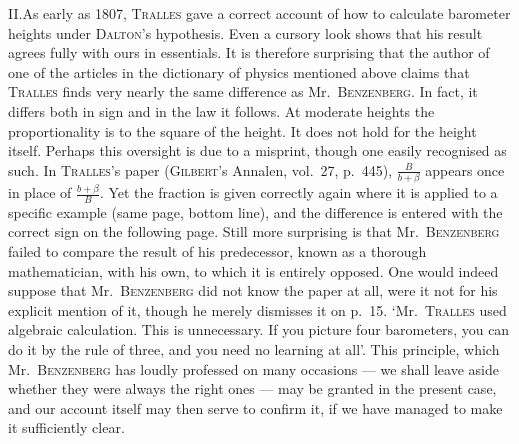 II.\quad As early as 1807, \textsc{Tralles} gave a correct account of how to calculate barometer heights under \textsc{Dalton}’s hypothesis. Even a cursory look shows that his result agrees fully with ours in essentials. It is therefore surprising that the author of one of the articles in the dictionary of physics mentioned above claims that \textsc{Tralles} finds very nearly the same difference as Mr.\ \textsc{Benzenberg}. In fact, it differs both in sign and in the law it follows. At moderate
heights the proportionality is to the square of the height. It does not hold for the height itself. Perhaps this oversight is due to a misprint, though one easily recognised as such. In \textsc{Tralles}’s paper (\textsc{Gilbert}’s Annalen, vol.\ 27, p.\ 445), $\frac{B}{b+\beta}$ appears once in place of $\frac{b+\beta}{B}$. Yet the fraction is given correctly again where it is applied to a specific example (same page, bottom line), and the difference is entered with the correct sign on the following page. Still more surprising is that Mr.\ \textsc{Benzenberg} failed to compare the result of his predecessor, known as a thorough mathematician, with his own, to which it is entirely opposed. One would indeed suppose that Mr.\ \textsc{Benzenberg} did not know the paper at all, were it not for his explicit mention of it, though he merely dismisses it on p.\ 15. ‘Mr.\ \textsc{Tralles} used algebraic calculation. This is unnecessary. If you picture four barometers, you can do it by the rule of three, and you need no learning at all’. This principle, which Mr.\ \textsc{Benzenberg} has loudly professed on many occasions — we shall leave aside whether they were always the right ones — may be granted in the present case, and our account itself may then serve to confirm it, if we have managed to make it sufficiently clear.

